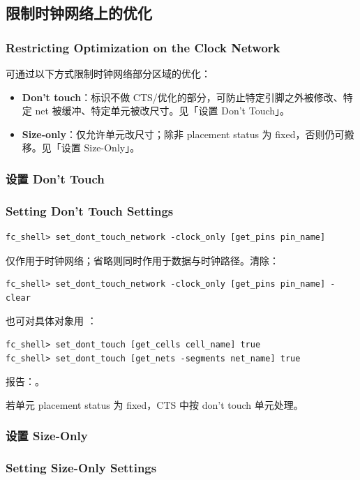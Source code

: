 \subsection{限制时钟网络上的优化}
\subsubsection*{Restricting Optimization on the Clock Network}

可通过以下方式限制时钟网络部分区域的优化：
\begin{itemize}
  \item \textbf{Don't touch}：标识不做 CTS/优化的部分，可防止特定引脚之外被修改、特定 net 被缓冲、特定单元被改尺寸。见「设置 Don't Touch」。
  \item \textbf{Size-only}：仅允许单元改尺寸；除非 placement status 为 fixed，否则仍可搬移。见「设置 Size-Only」。
\end{itemize}

\subsubsection{设置 Don't Touch}
\subsubsection*{Setting Don't Touch Settings}

\begin{lstlisting}
fc_shell> set_dont_touch_network -clock_only [get_pins pin_name]
\end{lstlisting}
 仅作用于时钟网络；省略则同时作用于数据与时钟路径。清除：
\begin{lstlisting}
fc_shell> set_dont_touch_network -clock_only [get_pins pin_name] -clear
\end{lstlisting}
也可对具体对象用 ：
\begin{lstlisting}
fc_shell> set_dont_touch [get_cells cell_name] true
fc_shell> set_dont_touch [get_nets -segments net_name] true
\end{lstlisting}
报告：。
\begin{noteBox}
若单元 placement status 为 fixed，CTS 中按 don't touch 单元处理。
\end{noteBox}

\subsubsection{设置 Size-Only}
\subsubsection*{Setting Size-Only Settings}

